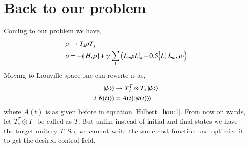 \section{Back to our problem}
Coming to our problem we have,
\begin{align}\label{Hilbert:2}
    \rho &\rightarrow T_{s}\rho T_{s}^{\dagger}\\
    \dot{\rho} &= - i\comm{H}{\rho} + \gamma
    \sum_{k} \left(L_{m} \rho L_{m}^{\dagger} - 0.5\anticommutator{L_{m}^{\dagger}L_{m}}{ \rho}\right)
\end{align}
Moving to Liouville space one can rewrite it as, 
 \begin{align}\label{Liouville:2}
     \ket{\psi}\rangle &\rightarrow T_{s}^{T} \otimes T_{s}\ket{\psi}\rangle\\
     i\ket{\dot{\psi}(t)}\rangle &= A(t)\ket{\psi(t)}\rangle
 \end{align}
where $A(t)$ is as given before in equation \eqref{Hilbert_liou:1}. From now on wards, let $T_{s}^{T} \otimes T_{s}$ be called as $T$.  But unlike \cite{2018EPJST.227..203S} instead of initial and final states we have the target unitary $T$. So, we cannot write the  same cost function and optimize it to get the desired control field. 

